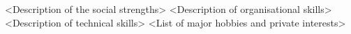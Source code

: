 \documentclass[english]{ecv}
\begin{document}
\begin{ecv}
\ecvPageBreak
{}
                {<Description of the social strengths>
                }
                {<Description of organisational skills>
                }
                {<Description of technical skills>}
                {<List of major hobbies and private interests>
                }



\end{ecv}

\end{document}
